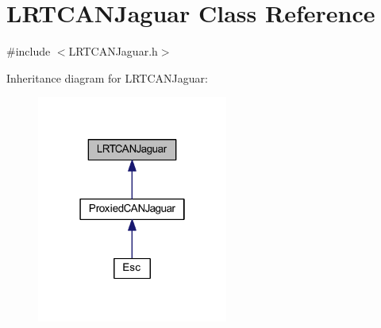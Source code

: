 \hypertarget{class_l_r_t_c_a_n_jaguar}{
\section{\-L\-R\-T\-C\-A\-N\-Jaguar \-Class \-Reference}
\label{class_l_r_t_c_a_n_jaguar}
}


{\ttfamily \#include $<$\-L\-R\-T\-C\-A\-N\-Jaguar.\-h$>$}



\-Inheritance diagram for \-L\-R\-T\-C\-A\-N\-Jaguar\-:\nopagebreak
\begin{figure}[H]
\begin{center}
\leavevmode
\includegraphics[width=178pt]{class_l_r_t_c_a_n_jaguar__inherit__graph}
\end{center}
\end{figure}
